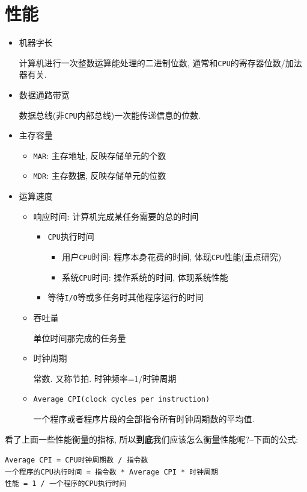 \section{性能}
\begin{itemize}
\item 机器字长 \par 计算机进行一次整数运算能处理的二进制位数, 通常和\verb|CPU|的寄存器位数/加法器有关.
\item 数据通路带宽 \par 数据总线(非\verb|CPU|内部总线)一次能传递信息的位数.
\item 主存容量
\begin{itemize}
\item \verb|MAR|: 主存地址, 反映存储单元的个数
\item \verb|MDR|: 主存数据, 反映存储单元的位数
\end{itemize}
\item 运算速度
\begin{itemize}
\item 响应时间: 计算机完成某任务需要的总的时间
\begin{itemize}
\item \verb|CPU|执行时间
\begin{itemize}
\item 用户\verb|CPU|时间: 程序本身花费的时间, 体现\verb|CPU|性能(重点研究)
\item 系统\verb|CPU|时间: 操作系统的时间, 体现系统性能
\end{itemize}
\item 等待\verb|I/O|等或多任务时其他程序运行的时间
\end{itemize}
\item 吞吐量 \par 单位时间那完成的任务量
\item 时钟周期 \par 常数. 又称节拍. 时钟频率=1/时钟周期
\item \verb|Average CPI(clock cycles per instruction)| \par 一个程序或者程序片段的全部指令所有时钟周期数的平均值.
\end{itemize}
\end{itemize} \par
看了上面一些性能衡量的指标, 所以\textbf{到底}我们应该怎么衡量性能呢?--下面的公式: \par 
\begin{center}
\verb|Average CPI = CPU时钟周期数 / 指令数|\\
\verb|一个程序的CPU执行时间 = 指令数 * Average CPI * 时钟周期|\\
\verb|性能 = 1 / 一个程序的CPU执行时间|
\end{center}
